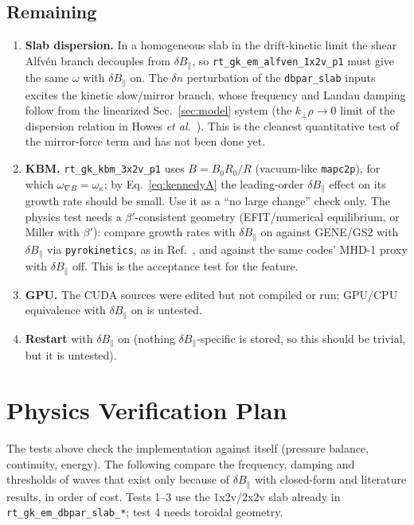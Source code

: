\documentclass[11pt, letterpaper]{article}
\newcommand{\dBpar}{\delta B_\parallel}
\newcommand{\code}[1]{\texttt{#1}}
\begin{document}
\subsection{Remaining}
\begin{enumerate}
  \item \textbf{Slab dispersion.} In a homogeneous slab in the drift-kinetic limit the shear
  Alfv\'en branch decouples from $\dBpar$, so \code{rt\_gk\_em\_alfven\_1x2v\_p1} must give the
  same $\omega$ with $\dBpar$ on. The $\delta n$ perturbation of the \code{dbpar\_slab} inputs
  excites the kinetic slow/mirror branch, whose frequency and Landau damping follow from the
  linearized Sec.~\ref{sec:model} system (the $k_\perp\rho\to0$ limit of the dispersion relation
  in Howes \emph{et al.}~\cite{Howes2006}). This is the cleanest quantitative test of the
  mirror-force term and has not been done yet.
  \item \textbf{KBM.} \code{rt\_gk\_kbm\_3x2v\_p1} uses $B=B_0R_0/R$ (vacuum-like
  \code{mapc2p}), for which $\omega_{\nabla B}=\omega_\kappa$; by Eq.~\eqref{eq:kennedyA} the
  leading-order $\dBpar$ effect on its growth rate should be small. Use it as a ``no large change''
  check only. The physics test needs a $\beta'$-consistent geometry (EFIT/numerical equilibrium, or
  Miller with $\beta'$): compare growth rates with $\dBpar$ on against GENE/GS2 with $\dBpar$ via
  \code{pyrokinetics}, as in Ref.~\cite{Kennedy2024}, and against the same codes' MHD-1 proxy with
  $\dBpar$ off. This is the acceptance test for the feature.
  \item \textbf{GPU.} The CUDA sources were edited but not compiled or run; GPU/CPU equivalence
  with $\dBpar$ on is untested.
  \item \textbf{Restart} with $\dBpar$ on (nothing $\dBpar$-specific is stored, so this should be
  trivial, but it is untested).
\end{enumerate}

\section{Physics Verification Plan}
\label{sec:physverif}
The tests above check the implementation against itself (pressure balance, continuity, energy).
The following compare the frequency, damping and thresholds of waves that exist only because of
$\dBpar$ with closed-form and literature results, in order of cost. Tests 1--3 use the 1x2v/2x2v
slab already in \code{rt\_gk\_em\_dbpar\_slab\_*}; test 4 needs toroidal geometry.
\end{document}
